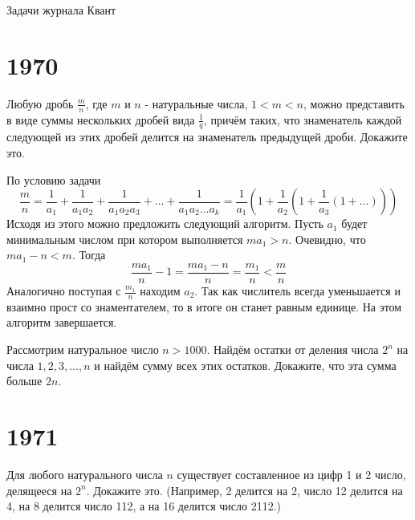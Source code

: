\documentclass[11pt, a4paper]{template}
\begin{document}
\begin{titlepage}
  \begin{center}
	\Huge{Задачи журнала Квант}
  \end{center}
\end{titlepage}

\chapter{1970}

\begin{exercise}[M24]
Любую дробь $\frac{m}{n}$, где $m$ и $n$ - натуральные числа, $1 < m < n$, можно представить в виде суммы нескольких дробей вида $\frac{1}{q}$, причём таких, что знаменатель каждой следующей из этих дробей делится на знаменатель предыдущей дроби. Докажите это.
\end{exercise}

\begin{solution}
По условию задачи
$$
\frac{m}{n} = \frac{1}{a_{1}} + \frac{1}{a_{1}a_{2}} + \frac{1}{a_{1}a_{2}a_{3}} + \dots + \frac{1}{a_{1}a_{2}\dots a_{k}} = \frac{1}{a_{1}} \left( 1 + \frac{1}{a_{2}} \left( 1 + \frac{1}{a_{3}} (1 + \dots ) \right) \right)
$$
Исходя из этого можно предложить следующий алгоритм. Пусть $a_{1}$ будет  минимальным числом при котором выполняется $ma_{1} > n$. Очевидно, что $ma_{1} - n < m$. Тогда 
$$
\frac{ma_{1}}{n} - 1 = \frac{ma_{1}-n}{n} = \frac{m_{1}}{n} < \frac{m}{n}
$$
Аналогично поступая с $\frac{m_{1}}{n}$ находим $a_{2}$. Так как числитель всегда уменьшается и взаимно прост со знаментателем, то в итоге он станет равным единице. На этом алгоритм завершается. 
\end{solution}

\begin{exercise}[M33]
Рассмотрим натуральное число $n > 1000$. Найдём остатки от деления числа $2^{n}$ на числа $1, 2, 3, \dots, n$ и найдём сумму всех этих остатков. Докажите, что эта сумма больше $2n$.
\end{exercise}

\chapter{1971}

\begin{exercise}[M113]
Для любого натурального числа $n$ существует составленное из цифр 1 и 2 число, делящееся на $2^{n}$. Докажите это. (Например, 2 делится на 2, число 12 делится на 4, на 8 делится число 112, а на 16 делится число 2112.)
\end{exercise}
\end{document}
